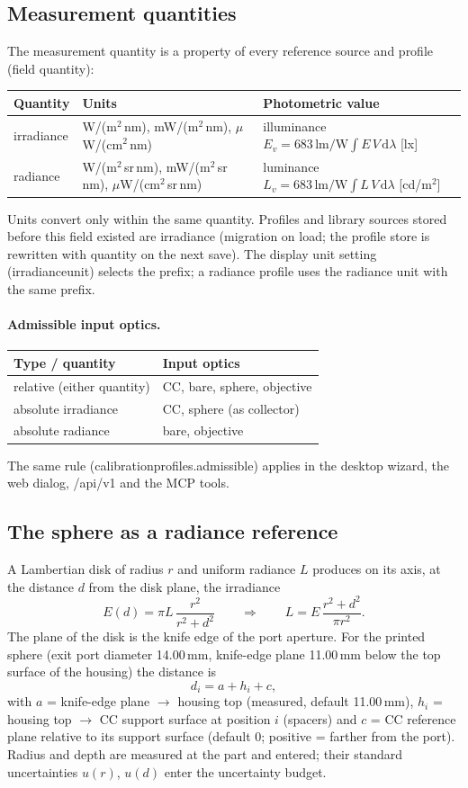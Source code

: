 \documentclass[12pt,a4paper]{article}
\DeclareRobustCommand{\code}[1]{{\ttfamily\small\def\_{\rawus\allowbreak}#1}}
\DeclareRobustCommand{\key}[1]{{\ttfamily\small\color{acc2}\def\_{\rawus\allowbreak}#1}}
\begin{document}
\subsection{Measurement quantities}
The measurement quantity is a property of every reference source and profile
(field \code{quantity}):
\begin{longtable}{@{}p{2.6cm}p{5.4cm}p{6.2cm}@{}}
\toprule \textbf{Quantity} & \textbf{Units} & \textbf{Photometric value}\\ \midrule\endhead
\code{irradiance} & W/(m$^2$\,nm), mW/(m$^2$\,nm), $\mu$W/(cm$^2$\,nm) &
  illuminance $E_v = 683\,\mathrm{lm/W}\int E\,V\,\mathrm d\lambda$ [lx]\\
\code{radiance} & W/(m$^2$\,sr\,nm), mW/(m$^2$\,sr\,nm), $\mu$W/(cm$^2$\,sr\,nm) &
  luminance $L_v = 683\,\mathrm{lm/W}\int L\,V\,\mathrm d\lambda$ [cd/m$^2$]\\
\bottomrule
\end{longtable}
Units convert only within the same quantity. Profiles and library sources
stored before this field existed are irradiance (migration on load; the
profile store is rewritten with \code{quantity} on the next save). The display
unit setting (\key{irradiance\_unit}) selects the prefix; a radiance profile
uses the radiance unit with the same prefix.

\paragraph{Admissible input optics.}
\begin{longtable}{@{}p{4.2cm}p{10.0cm}@{}}
\toprule \textbf{Type / quantity} & \textbf{Input optics}\\ \midrule\endhead
relative (either quantity) & CC, bare, sphere, objective\\
absolute irradiance & CC, sphere (as collector)\\
absolute radiance & bare, objective\\
\bottomrule
\end{longtable}
The same rule (\code{calibration\_profiles.admissible}) applies in the desktop
wizard, the web dialog, \code{/api/v1} and the MCP tools.

\subsection{The sphere as a radiance reference}
A Lambertian disk of radius $r$ and uniform radiance $L$ produces on its axis,
at the distance $d$ from the disk plane, the irradiance
\[
  E(d) = \pi L\,\frac{r^2}{r^2+d^2}
  \qquad\Longrightarrow\qquad
  L = E\,\frac{r^2+d^2}{\pi r^2}.
\]
The plane of the disk is the knife edge of the port aperture. For the printed
sphere (exit port diameter 14.00\,mm, knife-edge plane 11.00\,mm below the top
surface of the housing) the distance is
\[
  d_i = a + h_i + c ,
\]
with $a$ = knife-edge plane $\to$ housing top (measured, default 11.00\,mm),
$h_i$ = housing top $\to$ CC support surface at position $i$ (spacers) and
$c$ = CC reference plane relative to its support surface (default 0; positive
= farther from the port). Radius and depth are measured at the part and
entered; their standard uncertainties $u(r)$, $u(d)$ enter the uncertainty
budget.
\end{document}
